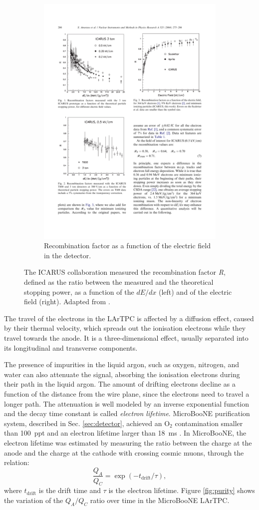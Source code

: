 \begin{figure}[htbp]
\begin{subfigure}{0.48\textwidth}
\begin{center}
        \includegraphics[height=0.9\linewidth]{figures/icarus2.pdf}
        \caption{Recombination factor as a function of the electric field in the detector.}
    \end{center}
  \end{subfigure}
    \caption{The ICARUS collaboration measured the recombination factor \emph{R}, defined as the ratio between the measured and the theoretical stopping power, as a function of the $dE/dx$ (left) and of the electric field (right). Adapted from \cite{Amoruso:2004dy}.}\label{fig:recombination}
\end{figure}

The travel of the electrons in the LArTPC is affected by a diffusion effect, caused by their thermal velocity, which spreads out the ionisation electrons while they travel towards the anode. It is a three-dimensional effect, usually separated into its longitudinal and transverse components. 

The presence of impurities in the liquid argon, such as oxygen, nitrogen, and water can also attenuate the signal, absorbing the ionisation electrons during their path in the liquid argon. The amount of drifting electrons decline as a function of the distance from the wire plane, since the electrons need to travel a longer path. The attenuation is well modeled by an inverse exponential function and the decay time constant is called \emph{electron lifetime}. MicroBooNE purification system, described in Sec. \ref{sec:detector}, achieved an O$_2$ contamination smaller than 100~ppt and an electron lifetime larger than 18~ms \cite{Meddage:2017lxo}. In MicroBooNE, the electron lifetime was estimated by measuring the ratio between the charge at the anode and the charge at the cathode with crossing cosmic muons, through the relation:
\begin{equation}
    \frac{Q_A}{Q_C} = \exp(-t_{\mathrm{drift}}/\tau),
\end{equation}
where $t_\mathrm{drift}$ is the drift time and $\tau$ is the electron lifetime. Figure \ref{fig:purity} shows the variation of the $Q_A/Q_C$ ratio over time in the MicroBooNE LArTPC.

